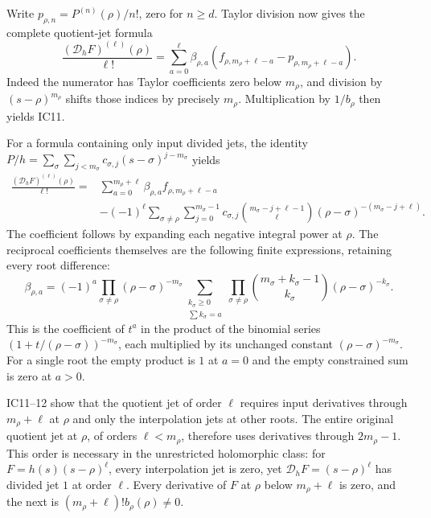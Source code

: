 Write $p_{\rho,n}=P^{(n)}(\rho)/n!$, zero for $n\ge d$.
Taylor division now gives the complete quotient-jet formula
\begin{equation}\tag{IC11}
 \frac{(\mathcal D_hF)^{(\ell)}(\rho)}{\ell!}
 =\sum_{a=0}^{\ell}\beta_{\rho,a}
        (f_{\rho,m_\rho+\ell-a}-p_{\rho,m_\rho+\ell-a}).
\end{equation}
Indeed the numerator has Taylor coefficients zero below
$m_\rho$, and division by $(s-\rho)^{m_\rho}$ shifts those
indices by precisely $m_\rho$. Multiplication by $1/b_\rho$
then yields IC11.

For a formula containing only input divided jets, the identity
$P/h=\sum_\sigma\sum_{j<m_\sigma}c_{\sigma,j}
(s-\sigma)^{j-m_\sigma}$ yields
\begin{equation}\tag{IC12}
 \begin{split}
 \frac{(\mathcal D_hF)^{(\ell)}(\rho)}{\ell!}
 ={}&\sum_{a=0}^{m_\rho+\ell}\beta_{\rho,a}f_{\rho,m_\rho+\ell-a}\\
 &-(-1)^\ell\sum_{\sigma\ne\rho}\sum_{j=0}^{m_\sigma-1}
 c_{\sigma,j}\binom{m_\sigma-j+\ell-1}{\ell}
 (\rho-\sigma)^{-(m_\sigma-j+\ell)}.
 \end{split}
\end{equation}
The coefficient follows by expanding each negative integral
power at $\rho$. The reciprocal coefficients themselves are
the following finite expressions, retaining every root difference:
\begin{equation}\tag{IC13}
 \beta_{\rho,a}=(-1)^a\prod_{\sigma\ne\rho}(\rho-\sigma)^{-m_\sigma}
 \sum_{\substack{k_\sigma\ge0\\\sum k_\sigma=a}}
 \prod_{\sigma\ne\rho}\binom{m_\sigma+k_\sigma-1}{k_\sigma}
                    (\rho-\sigma)^{-k_\sigma}.
\end{equation}
This is the coefficient of $t^a$ in the product of the binomial
series $(1+t/(\rho-\sigma))^{-m_\sigma}$, each multiplied by
its unchanged constant $(\rho-\sigma)^{-m_\sigma}$.
For a single root the empty product is $1$ at $a=0$ and the
empty constrained sum is zero at $a>0$.

IC11--12 show that the quotient jet of order $\ell$ requires
input derivatives through $m_\rho+\ell$ at $\rho$ and only
the interpolation jets at other roots. The entire original quotient
jet at $\rho$, of orders $\ell<m_\rho$, therefore uses derivatives
through $2m_\rho-1$. This order is necessary in the unrestricted
holomorphic class: for $F=h(s)(s-\rho)^\ell$, every interpolation
jet is zero, yet $\mathcal D_hF=(s-\rho)^\ell$ has divided jet
$1$ at order $\ell$. Every derivative of $F$ at $\rho$ below
$m_\rho+\ell$ is zero, and the next is
$(m_\rho+\ell)!b_\rho(\rho)\ne0$.

